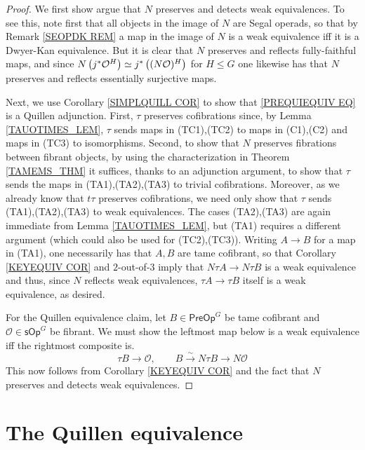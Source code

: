 \documentclass[a4paper,10pt
,draft
]{article}%
\numberwithin{equation}{section}
\numberwithin{figure}{section}
\theoremstyle{definition} %
\renewcommand{\O}{\ensuremath{\mathcal O}}
\newcommand{\1}{\ensuremath{\mathbbm 1}}%
\begin{document}
\begin{proof}
	We first show argue that $N$ preserves and detects weak equivalences.
	To see this, note first that all objects in the image of $N$ are Segal operads, so that by Remark \ref{SEOPDK REM} a map in the image of $N$ is a weak equivalence iff it is a Dwyer-Kan equivalence.
	But it is clear that $N$ preserves and reflects fully-faithful maps,
	and since
	$N \left(j^{\**} \O^H \right)
	\simeq
	j^{\**} \left( (N \O)^H \right)$
	for $H\leq G$
	one likewise has that 
	$N$ preserves and reflects essentially surjective maps.
	
	Next, we use Corollary \ref{SIMPLQUILL COR}
	to show that \eqref{PREQUIEQUIV EQ}
	is a Quillen adjunction.
	First,
	$\tau$ preserves cofibrations since,
	by Lemma \ref{TAUOTIMES_LEM},
	$\tau$ sends maps in (TC1),(TC2) to maps in (C1),(C2)
	and maps in (TC3) to isomorphisms.
	Second, to show that $N$ preserves fibrations between fibrant objects,
	by using the characterization in Theorem \ref{TAMEMS_THM}
	it suffices, thanks to an adjunction argument,
	to show that $\tau$
	sends the maps in (TA1),(TA2),(TA3)
	to trivial cofibrations. 
	Moreover, as we already know that $t\tau$ preserves cofibrations, we need only show 	that $\tau$
	sends (TA1),(TA2),(TA3)
	to weak equivalences.
	The cases (TA2),(TA3) are again immediate 
	from Lemma \ref{TAUOTIMES_LEM},
	but (TA1) requires a different argument
	(which could also be used for (TC2),(TC3)).
	Writing $A \to B$ for a map in (TA1), one necessarily has that $A,B$ are tame cofibrant, so that
	Corollary \ref{KEYEQUIV COR}
	and $2$-out-of-$3$ imply that 
	$N \tau A \to N \tau B$ is a weak equivalence
	and thus, since $N$ reflects weak equivalences,
	$\tau A \to \tau B$ itself is a weak equivalence,
	as desired.
	
	For the Quillen equivalence claim, 
	let $B \in \mathsf{PreOp}^G$ be tame cofibrant and
	$\mathcal{O} \in \mathsf{sOp}^G$ be fibrant.
	We must show the leftmost map below is a weak equivalence iff 
	the rightmost composite is.
	\[
	\tau B \to \mathcal{O},
	\qquad
	B \xrightarrow{\sim} N \tau B \to N \mathcal{O}
	\]
	This now follows from Corollary \ref{KEYEQUIV COR}
	and the fact that $N$ preserves and detects weak equivalences.
\end{proof}








\section{The Quillen equivalence}
\label{QE_SEC}
\end{document}
